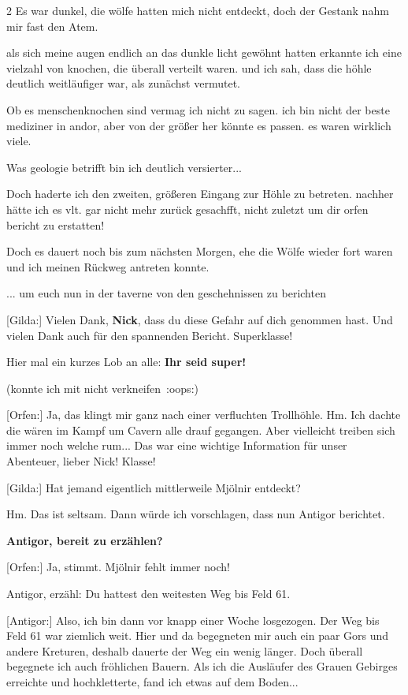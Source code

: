 \documentclass[10pt, a4paper, oneside]{book}
\begin{document}
\begin{multicols}{2}
Es war dunkel, die wölfe hatten mich nicht entdeckt, doch der Gestank nahm mir fast den Atem.

als sich meine augen endlich an das dunkle licht gewöhnt hatten erkannte ich eine vielzahl von knochen, die überall verteilt waren. und ich sah, dass die höhle deutlich weitläufiger war, als zunächst vermutet.

Ob es menschenknochen sind vermag ich nicht zu sagen. ich bin nicht der beste mediziner in andor, aber von der größer her könnte es passen. es waren wirklich viele.

Was geologie betrifft bin ich deutlich versierter...

Doch haderte ich den zweiten, größeren Eingang zur Höhle zu betreten. nachher hätte ich es vlt. gar nicht mehr zurück gesachfft, nicht zuletzt um dir orfen bericht zu erstatten!

Doch es dauert noch bis zum nächsten Morgen, ehe die Wölfe wieder fort waren und ich meinen Rückweg antreten konnte.

... um euch nun in der taverne von den geschehnissen zu berichten

[Gilda:] Vielen Dank, \textbf{Nick}, dass du diese Gefahr auf dich genommen hast. Und vielen Dank auch für den spannenden Bericht. Superklasse!

Hier mal ein kurzes Lob an alle: \textbf{Ihr seid super!}

(konnte ich mit nicht verkneifen :oops:)

[Orfen:] Ja, das klingt mir ganz nach einer verfluchten Trollhöhle. Hm. Ich dachte die wären im Kampf um Cavern alle drauf gegangen. Aber vielleicht treiben sich immer noch welche rum... Das war eine wichtige Information für unser Abenteuer, lieber Nick! Klasse!

[Gilda:] Hat jemand eigentlich mittlerweile Mjölnir entdeckt?

Hm. Das ist seltsam. Dann würde ich vorschlagen, dass nun Antigor berichtet.

\textbf{Antigor, bereit zu erzählen?}

[Orfen:] Ja, stimmt. Mjölnir fehlt immer noch!

Antigor, erzähl: Du hattest den weitesten Weg bis Feld 61.

[Antigor:] Also, ich bin dann vor knapp einer Woche losgezogen. Der Weg bis Feld 61 war ziemlich weit. Hier und da begegneten mir auch ein paar Gors und andere Kreturen, deshalb dauerte der Weg ein wenig länger. Doch überall begegnete ich auch fröhlichen Bauern. Als ich die Ausläufer des Grauen Gebirges erreichte und hochkletterte, fand ich etwas auf dem Boden...


\end{multicols}
\end{document}
